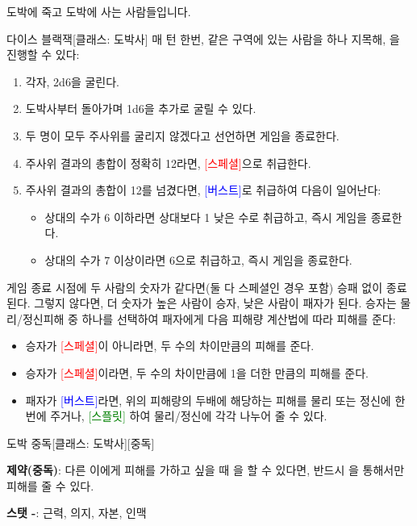 \documentclass{report}
\begin{document}
	도박에 죽고 도박에 사는 사람들입니다.
	
	\begin{story}{다이스 블랙잭}{[클래스: 도박사]}
		매 턴 한번, 같은 구역에 있는 사람을 하나 지목해, 을 진행할 수 있다:
		\begin{enumerate}
			\setlength\itemsep{0.2em}
			\item 각자, 2d6을 굴린다.
			\item 도박사부터 돌아가며 1d6을 추가로 굴릴 수 있다.
			\item 두 명이 모두 주사위를 굴리지 않겠다고 선언하면 게임을 종료한다.
			\item 주사위 결과의 총합이 정확히 12라면, \textcolor{red}{[스페셜]}으로 취급한다.
			\item 주사위 결과의 총합이 12를 넘겼다면, \textcolor{blue}{[버스트]}로 취급하여 다음이 일어난다:
			\begin{itemize}
				\item 상대의 수가 6 이하라면 상대보다 1 낮은 수로 취급하고, 즉시 게임을 종료한다.
				\item 상대의 수가 7 이상이라면 6으로 취급하고, 즉시 게임을 종료한다.
			\end{itemize}
		\end{enumerate}
		게임 종료 시점에 두 사람의 숫자가 같다면(둘 다 스페셜인 경우 포함) 승패 없이 종료된다. 그렇지 않다면, 더 숫자가 높은 사람이 승자, 낮은 사람이 패자가 된다. 승자는 물리/정신피해 중 하나를 선택하여 패자에게 다음 피해량 계산법에 따라 피해를 준다:
		\begin{itemize}
			\item 승자가 \textcolor{red}{[스페셜]}이 아니라면, 두 수의 차이만큼의 피해를 준다.
			\item 승자가 \textcolor{red}{[스페셜]}이라면, 두 수의 차이만큼에 1을 더한 만큼의 피해를 준다.
			\item 패자가 \textcolor{blue}{[버스트]}라면, 위의 피해량의 두배에 해당하는 피해를 물리 또는 정신에 한번에 주거나, \textcolor{green}{[스플릿]} 하여 물리/정신에 각각 나누어 줄 수 있다.
		\end{itemize}
		
	\end{story}
	
	\begin{story}{도박 중독}{[클래스: 도박사][중독]}
		
		\textbf{제약(중독)}: 다른 이에게 피해를 가하고 싶을 때 을 할 수 있다면, 반드시 을 통해서만 피해를 줄 수 있다.
		
		\smallskip
		
		\textbf{스탯 -}: 근력, 의지, 자본, 인맥
		
	\end{story}
	
\end{document}
